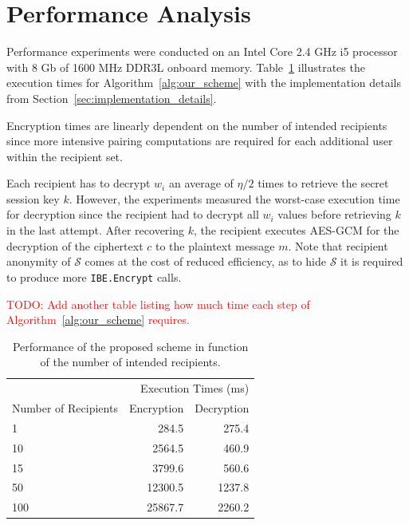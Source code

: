 \section{Performance Analysis}
Performance experiments were conducted on an Intel Core 2.4 GHz i5 processor with 8 Gb of 1600 MHz DDR3L onboard memory. Table~\ref{table:performance_of_proposed_scheme} illustrates the  execution times for Algorithm~\ref{alg:our_scheme} with the implementation details from Section~\ref{sec:implementation_details}. 

Encryption times are linearly dependent on the number of intended recipients since more intensive pairing computations are required for each additional user within the recipient set.

Each recipient has to decrypt $w_i$ an average of $\eta/2$ times to retrieve the secret session key $k$. However, the experiments measured the worst-case execution time for decryption since the recipient had to decrypt all $w_i$ values before retrieving $k$ in the last attempt. After recovering $k$, the recipient executes AES-GCM for the decryption of the ciphertext $c$ to the plaintext message $m$. Note that recipient anonymity of $\mathcal{S}$ comes at the cost of reduced efficiency, as to hide $\mathcal{S}$ it is required to produce more \texttt{IBE.Encrypt} calls.

\textcolor{red}{TODO: Add another table listing how much time each step of Algorithm~\ref{alg:our_scheme} requires.}

\begin{table}
  \centering
  \begin{tabular}{@{}lrr@{}} \toprule
    \multicolumn{3}{r}{Execution Times (ms)} \\ \cmidrule(r){2-3}
    Number of Recipients & Encryption & Decryption \\ \midrule
    1 & 284.5 & 275.4  \\
    10 & 2564.5  & 460.9  \\
    15 & 3799.6  & 560.6  \\
    50 & 12300.5  & 1237.8  \\
    100 & 25867.7  & 2260.2  \\  \bottomrule
  \end{tabular}
  \caption{Performance of the proposed scheme in function of the number of intended recipients.}
  \label{table:performance_of_proposed_scheme}
\end{table}

